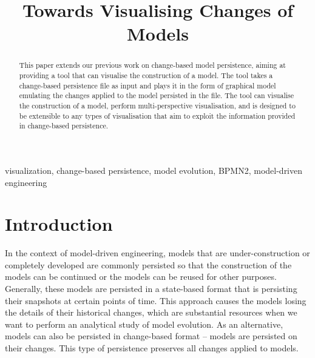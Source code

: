 \documentclass[conference]{IEEEtran}
\begin{document}
\title{Towards Visualising Changes of Models
}

\author{
}
\maketitle

\begin{abstract}
This paper extends our previous work on change-based model persistence, aiming at
providing a tool that can visualise the construction of a model. The tool 
takes a change-based persistence file as input and plays it 
in the form of graphical model emulating the changes applied to 
the model persisted in the file. 
The tool can visualise the construction of a model, 
perform multi-perspective visualisation, and
is designed to be extensible to any types of visualisation 
that aim to exploit the information provided in change-based persistence.


\end{abstract}

\begin{IEEEkeywords}
visualization, change-based persistence, model evolution, BPMN2, model-driven engineering
\end{IEEEkeywords}

\section{Introduction}
\label{sec:introduction}
In the context of model-driven engineering, models that are under-construction or completely developed are commonly persisted 
so that the construction of the models can be continued or the models can be reused for other purposes. 
Generally, these models are persisted in a state-based format that is persisting their snapshots at certain points of time. 
This approach causes the models losing the details of their historical changes, which are substantial resources when 
we want to perform an analytical study of model evolution. As an alternative, models can also be persisted in change-based format -- models are 
persisted on their changes. This type of persistence preserves all changes applied to models.
\end{document}
